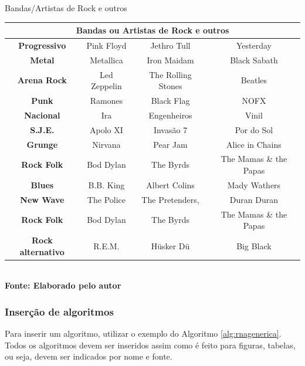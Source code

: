    	\begin{quadro}[H]
   		\centering
   		\caption{Bandas/Artistas de Rock e outros}
   	\label{qua:quadro1}
	\begin{tabular}{|c|c|c|c|} \hline
	\multicolumn{4}{|c|}{\textbf{Bandas ou Artistas de Rock e outros}} 	  \\ 
		\hline \textbf{	Progressivo} & Pink Floyd & Jethro Tull	& Yesterday \\ 
		 \hline \textbf{ Metal}  & Metallica & Iron Maidam & Black Sabath \\ 
		\hline \textbf{	Arena Rock} & Led Zeppelin & The Rolling Stones & Beatles \\ 
		\hline \textbf{ Punk} & Ramones & Black Flag & NOFX	\\ 
		\hline \textbf{	Nacional} & Ira & Engenheiros & Vinil	\\ 
		\hline \textbf{	S.J.E.} & Apolo XI & Invasão 7 & Por do Sol \\ 
		\hline \textbf{	Grunge} & Nirvana & Pear Jam & Alice in Chains	\\ 
		\hline \textbf{	Rock Folk} & Bod Dylan & The Byrds &  The Mamas \& the Papas \\
		\hline \textbf{	Blues} & B.B. King & Albert Colins & Mady Wathers \\ 
		\hline \textbf{	New Wave} & The Police & The Pretenders, &  Duran Duran\\ 
 		\hline \textbf{	Rock Folk} & Bod Dylan & The Byrds &  The Mamas \& the Papas \\
 		\hline \textbf{	Rock alternativo} & R.E.M.& Hüsker Dü & Big Black\\ 
		\hline
	\end{tabular}
	\vspace{.1cm}  %
	\small
	{\footnotesize\\ \textbf{Fonte: Elaborado pelo autor}}
   \end{quadro}

   
\subsubsection{\esp Inserção de algoritmos}

Para inserir um algoritmo, utilizar o exemplo do Algoritmo  \ref{alg:rnagenerica}.
Todos os algoritmos devem ser inseridos assim como é feito para figuras, tabelas, ou seja, devem ser indicados por nome e fonte.


